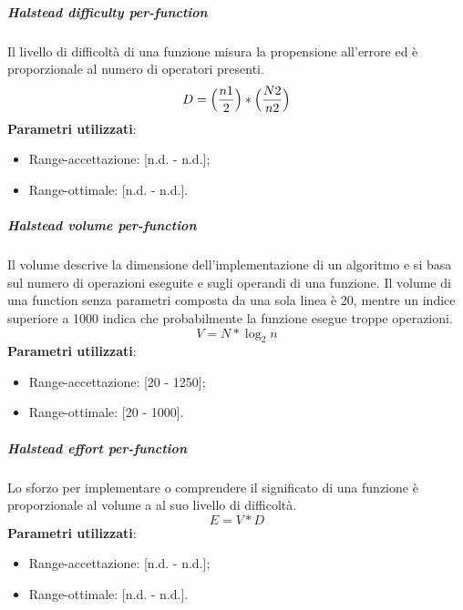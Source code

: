 			\subparagraph{Halstead difficulty per-function}
			Il livello di difficoltà di una funzione misura la propensione all'errore ed è proporzionale al numero di operatori presenti. 
			\[
			 D = \Bigl( \dfrac{n1}{2} \Bigr)  * \Bigl(  \dfrac{N2}{n2} \Bigr)
			 \]
			\textbf{Parametri utilizzati}:
			\begin{itemize}
				\item Range-accettazione: [n.d. - n.d.];
				\item Range-ottimale: [n.d. - n.d.].
			\end{itemize}

			
			\subparagraph{Halstead volume per-function}
			Il volume descrive la dimensione dell'implementazione di un algoritmo e si basa sul numero di operazioni eseguite e sugli operandi di una funzione. Il volume di una function senza parametri composta da una sola linea è 20, mentre un indice superiore a 1000 indica che probabilmente la funzione esegue troppe operazioni.
			\[
			 V = N * \log_{2}n
			\]
			\textbf{Parametri utilizzati}:
			\begin{itemize}
				\item Range-accettazione: [20 - 1250];
				\item Range-ottimale: [20 - 1000].
			\end{itemize}

			
			\subparagraph{Halstead effort per-function}
			Lo sforzo per implementare o comprendere il significato di una funzione è proporzionale al volume a al suo livello di difficoltà.
			 \[
			 E = V * D
			\]
			\textbf{Parametri utilizzati}:
			\begin{itemize}
				\item Range-accettazione: [n.d. - n.d.];
				\item Range-ottimale: [n.d. - n.d.].
			\end{itemize}

			
			
			
			


